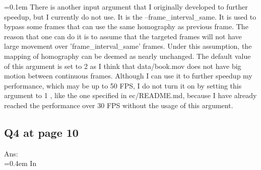 \documentclass{article}
\begin{document}
	\hangindent=0.1em \hspace{0.1em}There is another input argument that I originally developed to further speedup, but I currently do not use. It is the --frame\_interval\_same. It is used to bypass some frames that can use the same homography as previous frame. The reason that one can do it is to assume that the targeted frames will not have large movement over 'frame\_interval\_same' frames. Under this assumption, the mapping of homography can be deemed as nearly unchanged. The default value of this argument is set to 2 as I think that data/book.mov does not have big motion between continuous frames. Although I can use it to further speedup my performance, which may be up to 50 FPS, I do not turn it on by setting this argument to 1 , like the one specified in ec/README.md, because I have already reached the performance over 30 FPS without the usage of this argument.

	\newpage
	\subsection*{Q4 at page 10}
	Ans:\\
	\hangindent=0.4em \hspace{0.3em} In





	
\end{document}
